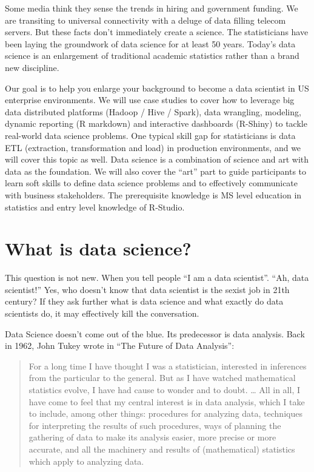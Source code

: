 \documentclass[]{book}
\theoremstyle{definition}
\theoremstyle{definition}
\theoremstyle{remark}
\begin{document}
Some media think they sense the trends in hiring and government funding.
We are transiting to universal connectivity with a deluge of data
filling telecom servers. But these facts don't immediately create a
science. The statisticians have been laying the groundwork of data
science for at least 50 years. Today's data science is an enlargement of
traditional academic statistics rather than a brand new discipline.

Our goal is to help you enlarge your background to become a data
scientist in US enterprise environments. We will use case studies to
cover how to leverage big data distributed platforms (Hadoop / Hive /
Spark), data wrangling, modeling, dynamic reporting (R markdown) and
interactive dashboards (R-Shiny) to tackle real-world data science
problems. One typical skill gap for statisticians is data ETL
(extraction, transformation and load) in production environments, and we
will cover this topic as well. Data science is a combination of science
and art with data as the foundation. We will also cover the ``art'' part
to guide participants to learn soft skills to define data science
problems and to effectively communicate with business stakeholders. The
prerequisite knowledge is MS level education in statistics and entry
level knowledge of R-Studio.

\section{What is data science?}\label{what-is-data-science}

This question is not new. When you tell people ``I am a data
scientist''. ``Ah, data scientist!'' Yes, who doesn't know that data
scientist is the sexist job in 21th century? If they ask further what is
data science and what exactly do data scientists do, it may effectively
kill the conversation.

Data Science doesn't come out of the blue. Its predecessor is data
analysis. Back in 1962, John Tukey wrote in ``The Future of Data
Analysis'':

\begin{quote}
For a long time I have thought I was a statistician, interested in
inferences from the particular to the general. But as I have watched
mathematical statistics evolve, I have had cause to wonder and to doubt.
\ldots{} All in all, I have come to feel that my central interest is in
data analysis, which I take to include, among other things: procedures
for analyzing data, techniques for interpreting the results of such
procedures, ways of planning the gathering of data to make its analysis
easier, more precise or more accurate, and all the machinery and results
of (mathematical) statistics which apply to analyzing data.
\end{quote}
\end{document}
